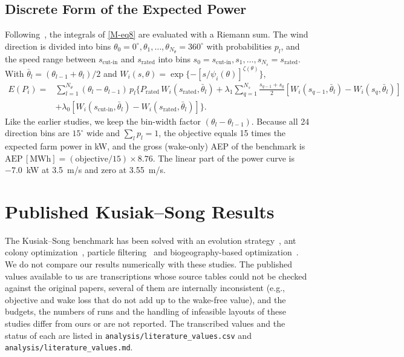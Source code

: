 \documentclass[10pt]{article}
\begin{document}
\subsection{Discrete Form of the Expected Power}
\label{sec:S-power}
Following~\cite{Kusiak2010}, the integrals of \eqref{M-eq8} are evaluated with a Riemann sum. The wind direction is divided into bins $\theta_0 = 0^\circ, \theta_1, \ldots, \theta_{N_\theta} = 360^\circ$ with probabilities $p_l$, and the speed range between $s_{\text{cut-in}}$ and $s_{\text{rated}}$ into bins $s_0 = s_{\text{cut-in}}, s_1, \ldots, s_{N_s} = s_{\text{rated}}$. With $\bar\theta_l=(\theta_{l-1}+\theta_l)/2$ and $W_i(s,\theta)=\exp\{-[s/\psi_i(\theta)]^{\zeta(\theta)}\}$,
\begin{equation}
\begin{split}
E(P_i) ={}& \sum_{l=1}^{N_\theta} (\theta_l - \theta_{l-1})\, p_l \Bigg\{ P_{\text{rated}}\, W_i(s_{\text{rated}},\bar\theta_l)
+\lambda_1 \sum_{q=1}^{N_s} \frac{s_{q-1} + s_q}{2}\left[W_i(s_{q-1},\bar\theta_l)-W_i(s_q,\bar\theta_l)\right]\\
&+ \lambda_0 \left[W_i(s_{\text{cut-in}},\bar\theta_l)-W_i(s_{\text{rated}},\bar\theta_l)\right] \Bigg\}.
\end{split}
\label{eq:S-power}
\end{equation}
Like the earlier studies, we keep the bin-width factor $(\theta_l-\theta_{l-1})$. Because all 24 direction bins are $15^\circ$ wide and $\sum_l p_l=1$, the objective equals 15 times the expected farm power in kW, and the gross (wake-only) AEP of the benchmark is $\mathrm{AEP}\,[\mathrm{MWh}] = (\text{objective}/15)\times 8.76$. The linear part of the power curve is $-7.0$~kW at 3.5~m/s and zero at 3.55~m/s.

\section{Published Kusiak--Song Results}
\label{sec:S-literature}
The Kusiak--Song benchmark has been solved with an evolution strategy~\cite{Kusiak2010}, ant colony optimization~\cite{Eroglu2012}, particle filtering~\cite{Eroglu2013} and biogeography-based optimization~\cite{Bansal2017}. We do not compare our results numerically with these studies. The published values available to us are transcriptions whose source tables could not be checked against the original papers, several of them are internally inconsistent (e.g., objective and wake loss that do not add up to the wake-free value), and the budgets, the numbers of runs and the handling of infeasible layouts of these studies differ from ours or are not reported. The transcribed values and the status of each are listed in \texttt{analysis/literature\_values.csv} and \texttt{analysis/literature\_values.md}.
\end{document}
